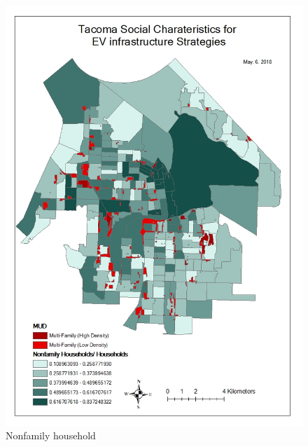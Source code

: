 \documentclass[]{article}
\begin{document}
\begin{figure}
\centering
\includegraphics{./figs/Nonfamily.jpg}
\caption{Nonfamily household}
\end{figure}
\end{document}
